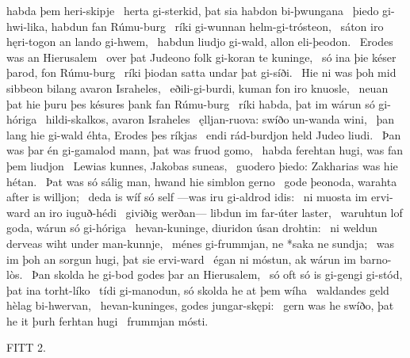 habda þem heri-skipje \hld\ herta gi-sterkid,
þat sia habdon bi-þwungana \hld\ þiedo gi-hwi-lika,
habdun fan Rúmu-burg \hld\ ríki gi-wunnan
helm-gi-trósteon, \hld\ sáton iro hęri-togon
an lando gi-hwem, \hld\ habdun liudjo gi-wald,
allon eli-þeodon. \hld\ Erodes was
an Hierusalem \hld\ over þat Judeono folk
gi-koran te kuninge, \hld\ só ina þie késer þarod,
fon Rúmu-burg \hld\ ríki þiodan
satta undar þat gi-síði. \hld\ Hie ni was þoh mid sibbeon bilang
avaron Israheles, \hld\ eðili-gi-burdi,
kuman fon iro knuosle, \hld\ neuan þat hie þuru þes késures þank
fan Rúmu-burg \hld\ ríki habda,
þat im wárun só gi-hóriga \hld\ hildi-skalkos,
avaron Israheles \hld\ ęlljan-ruova:
swíðo un-wanda wini, \hld\ þan lang hie gi-wald éhta,
Erodes þes ríkjas \hld\ endi rád-burdjon held
Judeo liudi. \hld\ Þan was þar én gi-gamalod mann,
þat was fruod gomo, \hld\ habda ferehtan hugi,
was fan þem liudjon \hld\ Lewias kunnes,
Jakobas suneas, \hld\ guodero þiedo:
Zakharias was hie hétan. \hld\ Þat was só sálig man,
hwand hie simblon gerno \hld\ gode þeonoda,
warahta after is willjon; \hld\ deda is wíf só self
—was iru gi-aldrod idis: \hld\ ni muosta im ervi-ward
an iro iuguð-hédi \hld\ giviðig werðan—
libdun im far-úter laster, \hld\ waruhtun lof goda,
wárun só gi-hóriga \hld\ hevan-kuninge,
diuridon úsan drohtin: \hld\ ni weldun derveas wiht
under man-kunnje, \hld\ ménes gi-frummjan,
ne *saka ne sundja; \hld\ was im þoh an sorgun hugi,
þat sie ervi-ward \hld\ égan ni móstun,
ak wárun im barno-lòs. \hld\ Þan skolda he gi-bod godes
þar an Hierusalem, \hld\ só oft só is gi-gengi gi-stód,
þat ina torht-líko \hld\ tídi gi-manodun,
só skolda he at þem wíha \hld\ waldandes geld
hèlag bi-hwervan, \hld\ hevan-kuninges,
godes jungar-skępi: \hld\ gern was he swíðo,
þat he it þurh ferhtan hugi \hld\ frummjan mósti.

FITT 2.

